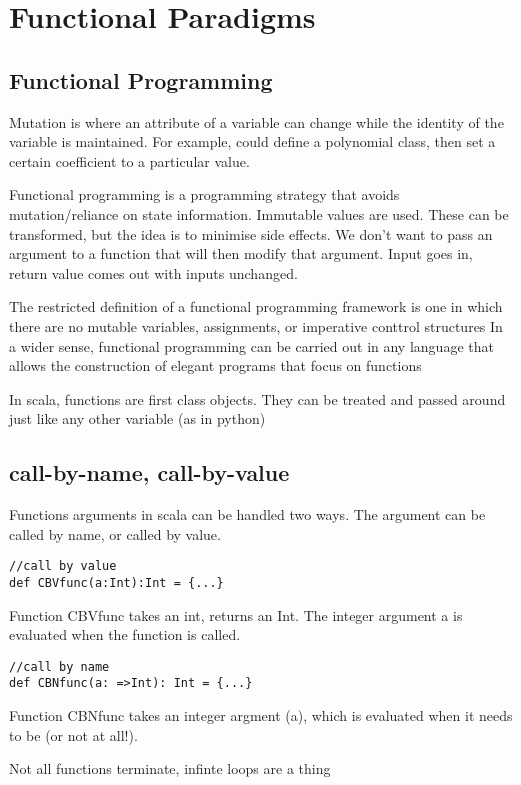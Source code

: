 \chapter{Functional Paradigms}
\section{Functional Programming}
Mutation is where an attribute of a variable can change while the identity of the variable is maintained.  For example, could define a polynomial class, then set a certain coefficient to a particular value.

Functional programming is a programming strategy that avoids mutation/reliance on state information. Immutable values are used. These can be transformed, but the idea is to minimise side effects. We don't want to pass an argument to a function that will then modify that argument. Input goes in, return value comes out with inputs unchanged.

The restricted definition of a functional programming framework is one in which there are no mutable variables, assignments, or imperative conttrol structures
In a wider sense, functional programming can be carried out in any language that allows the construction of elegant programs that focus on functions

In scala, functions are first class objects. They can be treated and passed around just like any other variable (as in python)


\section{call-by-name, call-by-value}
Functions arguments in scala can be handled two ways. The argument can be called by name, or called by value.

\begin{lstlisting}
//call by value
def CBVfunc(a:Int):Int = {...}
\end{lstlisting}
Function CBVfunc takes an int, returns an Int. The integer argument a is evaluated when the function is called.


\begin{lstlisting}
//call by name
def CBNfunc(a: =>Int): Int = {...}
\end{lstlisting}
Function CBNfunc takes an integer argment (a), which is evaluated when it needs to be (or not at all!).

Not all functions terminate, infinte loops are a thing

